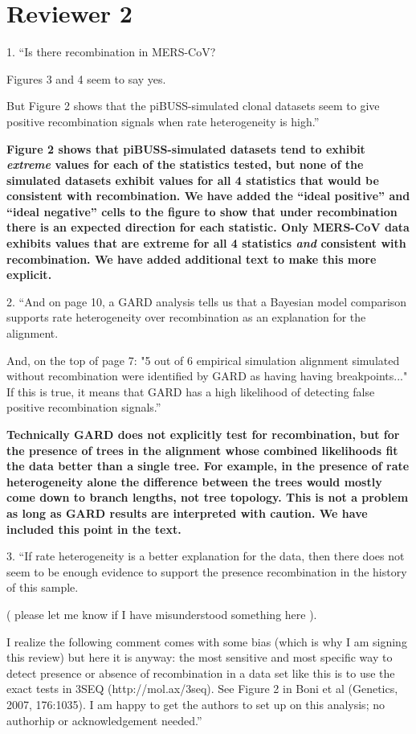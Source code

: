 \documentclass[11pt,oneside,letterpaper]{article}
\begin{document}
\section*{Reviewer 2}

1. ``Is there recombination in MERS-CoV?  

Figures 3 and 4 seem to say yes.

But Figure 2 shows that the piBUSS-simulated clonal datasets seem to give positive recombination signals when rate heterogeneity is high.''

\textbf{Figure 2 shows that piBUSS-simulated datasets tend to exhibit \textit{extreme} values for each of the statistics tested, but none of the simulated datasets exhibit values for all 4 statistics that would be consistent with recombination. 
We have added the “ideal positive” and “ideal negative” cells to the figure to show that under recombination there is an expected direction for each statistic. 
Only MERS-CoV data exhibits values that are extreme for all 4 statistics \textit{and} consistent with recombination. 
We have added additional text to make this more explicit.}

2. ``And on page 10, a GARD analysis tells us that a Bayesian model comparison supports rate heterogeneity over recombination as an explanation for the alignment.  

And, on the top of page 7: "5 out of 6 empirical simulation alignment simulated without recombination were identified by GARD as having having breakpoints..."  
If this is true, it means that GARD has a high likelihood of detecting false positive recombination signals.''

\textbf{Technically GARD does not explicitly test for recombination, but for the presence of trees in the alignment whose combined likelihoods fit the data better than a single tree. 
For example, in the presence of rate heterogeneity alone the difference between the trees would mostly come down to branch lengths, not tree topology. 
This is not a problem as long as GARD results are interpreted with caution. 
We have included this point in the text.}

3. ``If rate heterogeneity is a better explanation for the data, then there does not seem to be enough evidence to support the presence recombination in the history of this sample.

( please let me know if I have misunderstood something here ).

I realize the following comment comes with some bias (which is why I am signing this review) but here it is anyway: the most sensitive and most specific way to detect presence or absence of recombination in a data set like this is to use the exact tests in 3SEQ (http://mol.ax/3seq).  
See Figure 2 in Boni et al (Genetics, 2007, 176:1035).	
I am happy to get the authors to set up on this analysis; no authorhip or acknowledgement needed.''
\end{document}

